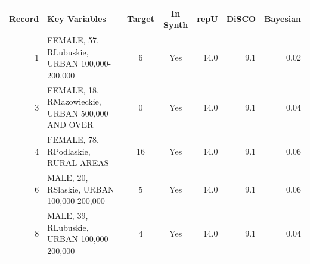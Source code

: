\begin{tabular}{rlccrrr}
  \toprule
Record & Key Variables & Target & In Synth & repU & DiSCO & Bayesian \\ 
  \midrule
  1 & FEMALE, 57, RLubuskie, URBAN 100,000-200,000 & 6 & Yes & 14.0 & 9.1 & 0.02 \\ 
    3 & FEMALE, 18, RMazowieckie, URBAN 500,000 AND OVER & 0 & Yes & 14.0 & 9.1 & 0.04 \\ 
    4 & FEMALE, 78, RPodlaskie, RURAL AREAS & 16 & Yes & 14.0 & 9.1 & 0.06 \\ 
    6 & MALE, 20, RSlaskie, URBAN 100,000-200,000 & 5 & Yes & 14.0 & 9.1 & 0.06 \\ 
    8 & MALE, 39, RLubuskie, URBAN 100,000-200,000 & 4 & Yes & 14.0 & 9.1 & 0.04 \\ 
   \bottomrule
\end{tabular}
